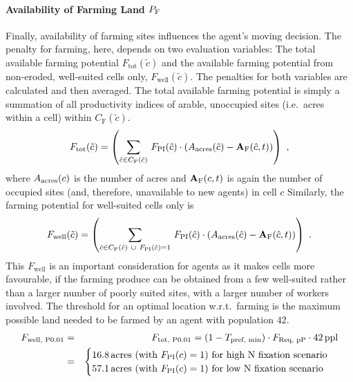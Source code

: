 \paragraph{Availability of Farming Land $P_{\rm F}$}
Finally, availability of farming sites influences the agent's moving decision.
The penalty for farming, here, depends on two evaluation variables: 
The total available farming potential $F_\text{tot}(\tilde{c})$ and the available farming potential from non-eroded, well-suited cells only, $F_\text{well}(\tilde{c})$.
The penalties for both variables are calculated and then averaged.
The total available farming potential is simply a summation of all productivity indices of arable, unoccupied sites (i.e.\ acres within a cell) within $C_\text{F}(\tilde{c})$.
\begin{equation}
	F_\text{tot}(\tilde{c}) = \left( \sum_{\hat{c} \in C_{\rm F}(\tilde{c}) }\, F_{\rm PI}(\hat{c}) \cdot (A_{\rm acres}(\hat{c})  - \mathbf{A}_{\rm F}(\hat{c}, t) )\right) \ ,
\end{equation}
where $A_{\rm acres}(c)$ is the number of acres and $ \mathbf{A}_{\rm F}(c,t)$ is again the number of occupied sites (and, therefore, unavailable to new agents) in cell $c$ 
Similarly, the farming potential for well-suited cells only is 
\begin{equation}
	F_\text{well}(\tilde{c}) = \left( \sum_{\hat{c} \in C_{\rm F}(\tilde{c}) \ \cup \ F_{\rm PI}(\hat{c})=1} \, F_{\rm PI}(\hat{c}) \cdot (A_{\rm acres}(\hat{c})  - \mathbf{A}_{\rm F}(\hat{c},t) )\right) \ .
\end{equation}
This $F_\text{well}$ is an important consideration for agents as it makes cells more favourable, if the farming produce can be obtained from a few well-suited rather than a larger number of poorly suited sites, with a larger number of workers involved.
The threshold for an optimal location w.r.t.\ farming is the maximum possible land needed to be farmed by an agent with population $42$.
\begin{eqnarray}
F_\text{well, P0.01} & = & F_\text{tot, P0.01} =  (1-T_\text{pref, min})\cdot F_\text{Req, pP} \cdot 42\, {\rm ppl}  \\
& = & 
\begin{cases} 16.8\, {\rm acres}  \text{ (with }F_{\rm PI}(c)=1\text{) for high N fixation scenario} \\  57.1 \, {\rm acres} \text{ (with }F_{\rm PI}(c)=1\text{) for low N fixation scenario} \nonumber
\end{cases} 
\end{eqnarray}
